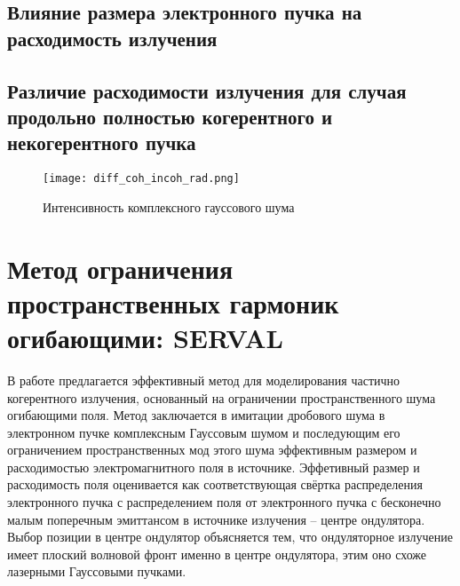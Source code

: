 \subsection{Влияние размера электронного пучка на расходимость излучения}

\subsection{Различие расходимости излучения для случая продольно полностью когерентного и некогерентного пучка}
\begin{figure}[H] 
	\centering 	\texttt{[image: diff\_coh\_incoh\_rad.png]}
	\caption{Интенсивность комплексного гауссового шума}
	\label{fig:diff_coh_incoh_rad}
\end{figure}
\section{Метод ограничения пространственных гармоник огибающими: SERVAL}
В работе предлагается эффективный метод для моделирования частично когерентного излучения, основанный на ограничении пространственного шума огибающими поля. Метод заключается в имитации дробового шума в электронном пучке комплексным Гауссовым шумом и последующим его ограничением пространственных мод этого шума эффективным размером и расходимостью электромагнитного поля в источнике. Эффетивный размер и расходимость поля оценивается как соответствующая свёртка распределения электронного пучка с распределением поля от электронного пучка с бесконечно малым поперечным эмиттансом в источнике излучения -- центре ондулятора. Выбор позиции в центре ондулятор объясняется тем, что ондуляторное излучение имеет плоский волновой фронт именно в центре ондулятора, этим оно схоже лазерными Гауссовыми пучками.

